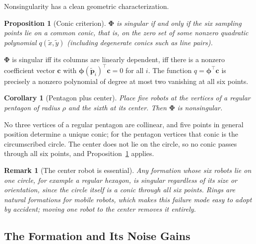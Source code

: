 \documentclass[lettersize,journal]{IEEEtran}
\newtheorem{proposition}{Proposition}
\newtheorem{corollary}{Corollary}
\newtheorem{remark}{Remark}
\begin{document}
Nonsingularity has a clean geometric characterization.

\begin{proposition}[Conic criterion]
\label{prop:conic}
$\boldsymbol{\Phi}$ is singular if and only if the six sampling points
lie on a common conic, that is, on the zero set of some nonzero quadratic
polynomial $q(\tilde{x}, \tilde{y})$ (including degenerate conics such as
line pairs).
\end{proposition}

\begin{IEEEproof}
$\boldsymbol{\Phi}$ is singular iff its columns are linearly dependent,
iff there is a nonzero coefficient vector $\mathbf{c}$ with
$\boldsymbol{\phi}(\tilde{\mathbf{p}}_i)^\top \mathbf{c} = 0$ for all
$i$. The function $q = \boldsymbol{\phi}^\top \mathbf{c}$ is precisely a
nonzero polynomial of degree at most two vanishing at all six points.
\end{IEEEproof}

\begin{corollary}[Pentagon plus center]
\label{cor:pentagon}
Place five robots at the vertices of a regular pentagon of radius $\rho$
and the sixth at its center. Then $\boldsymbol{\Phi}$ is nonsingular.
\end{corollary}

\begin{IEEEproof}
No three vertices of a regular pentagon are collinear, and five points in
general position determine a unique conic; for the pentagon vertices that
conic is the circumscribed circle. The center does not lie on the
circle, so no conic passes through all six points, and
Proposition~\ref{prop:conic} applies.
\end{IEEEproof}

\begin{remark}[The center robot is essential]
Any formation whose six robots lie on one circle, for example a regular
hexagon, is singular regardless of its size or orientation, since the
circle itself is a conic through all six points. Rings are natural
formations for mobile robots, which makes this failure mode easy to adopt
by accident; moving one robot to the center removes it entirely.
\end{remark}

\subsection{The Formation and Its Noise Gains}
\label{sec:formation}
\end{document}
